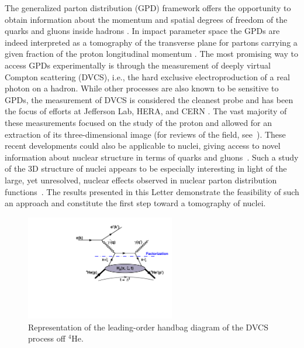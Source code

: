 \documentclass[twocolumn,nofootinbib,prl,superscriptaddress,secnumarabic,amssymb,nobibnotes,aps,floatfix]{revtex4}
\begin{document}
The generalized parton distribution (GPD) framework offers the opportunity to 
obtain information about the momentum and spatial degrees of freedom of the 
quarks and gluons inside hadrons \cite{Mueller:1998fv,Ji:1996ek,Ji:1996nm,
Radyushkin:1996nd,Radyushkin:1997ki}. In impact parameter space the GPDs are 
indeed interpreted as a tomography of the transverse plane for partons 
carrying a given fraction of the proton longitudinal momentum 
\cite{Burkardt:2000za,Diehl:2002he,Belitsky:2002ep,Burkardt:2005hp}. The most 
promising way to access GPDs experimentally is through the measurement of 
deeply virtual Compton scattering (DVCS), i.e., the hard exclusive 
electroproduction of a real photon on a hadron. While other processes are also 
known to be sensitive to GPDs, the measurement of DVCS is considered the 
cleanest probe and has been the focus of efforts at Jefferson Lab, HERA, and 
CERN 
\cite{Stepanyan:2001sm,Airapetian,Airapetian:2010nu,Chekanov:2003ya,Adloff:2001cn,Aktas:2005ty,Chen:2006na,
MunozCamacho:2006hx,Girod:2007aa,Mazouz:2007aa,Gavalian:2009,Seder:2015,Defurne:2015kxq,
Pisano:2015,Jo:2015ema,Joerg:2016hhs}. The vast majority of these measurements 
focused on the study of the proton and allowed for an extraction of its 
three-dimensional image (for reviews of the field, see~\cite{Goeke:2001tz,
Diehl:2003ny,Ji:2004gf,Belitsky:2005qn,Boffi:2007yc,Guidal:2013rya}). These 
recent developments could also be applicable to nuclei, giving access to novel 
information about nuclear structure in terms of quarks and gluons~\cite{Berger:2001zb,
Cano:2003ju,Guzey:2005ba,Dupre:2015jha}. Such a study of the 3D 
structure of nuclei appears to be especially interesting in light of the large, 
yet unresolved, nuclear effects observed in nuclear parton distribution 
functions~\cite{Geesaman:1995yd,Norton:2003cb,Hen:2016kwk}. The results 
presented in this Letter demonstrate the feasibility of such an approach and 
constitute the first step toward a tomography of nuclei.

\begin{figure}[tb]
\includegraphics[width=6.5cm]{DVCS_diagram.pdf}
\caption{Representation of the leading-order handbag diagram of the DVCS 
process off $^4$He.}
\label{fig:diags}
\end{figure}
\end{document}
